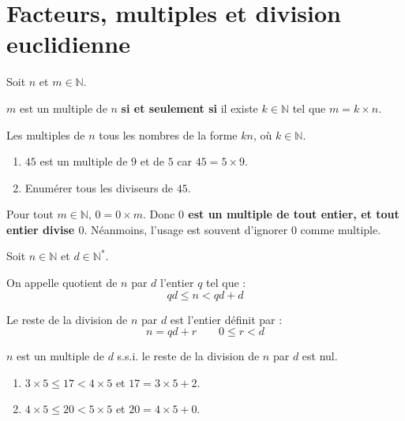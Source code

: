%	


%	 
\section{Facteurs, multiples et division euclidienne}
\begin{definition}[Multiples]
	Soit $n$ et $m\in\mathbb{N}$.
	
	$m$ est un multiple de $n$ \textbf{si et seulement si} il existe $k\in\mathbb{N}$ tel que $m=k\times n$.
	
	Les multiples de $n$ tous les nombres de la forme $kn$, où $k\in\mathbb{N}$.
\end{definition}
\begin{example}\hfill 
	\begin{enumerate}[label={\alph*)}, leftmargin=*]  
		\item $45$ est un multiple de $9$ et de $5$ car $45=5\times 9$.  
		\item Enumérer tous les diviseurs de $45$. 
	\end{enumerate}
\end{example}
\begin{remark}
	Pour tout $m\in \mathbb{N}$,  $0=0\times m$. Donc  \textbf{$0$ est un multiple de tout entier, et tout entier divise $0$}. Néanmoins, l'usage est souvent d'ignorer $0$ comme multiple. 
\end{remark}
\begin{definition} Soit $n\in\mathbb{N}$ et $d\in\mathbb{N}^*$.
	
	On appelle quotient de $n$ par $d$ l'entier $q$ tel que : 
	\[ qd\leqslant n < qd + d\]
	
	Le reste de la division de $n$ par $d$  est l'entier définit par :
	\[ n = qd + r
	\qquad 0\leqslant r < d \]
	
	$n$ est un multiple de $d$ s.s.i. le reste de la division de $n$
	par $d$ est nul.
\end{definition}
\begin{example} 
	\begin{marginfigure} 
		\hfill 
		\caption{$17=3\times 5 + 2$ et $20 = 4 \times 5$}
		\label{chapitre03:figure:divisionentiere}
	\end{marginfigure}
	\begin{enumerate}[label={\alph*)}, leftmargin=*]  
		\item $3\times 5\leqslant 17<4\times 5$ et $17=3\times 5+2$. 
		\item $4\times 5\leqslant 20<5\times 5$ et $20=4\times 5+0$.  
	\end{enumerate} 
\end{example}
